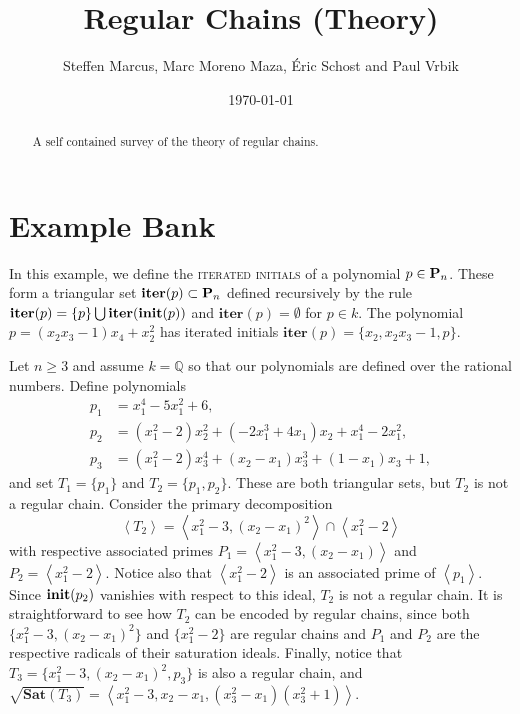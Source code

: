 \documentclass[12pt]{article}
\title{Regular Chains (Theory)}
\author{Steffen Marcus, Marc Moreno Maza, \'Eric Schost and Paul Vrbik}
\date{\today}
\newcommand{\Emph}[1]{\textsc{#1}}
\begin{document}
\maketitle


\begin{abstract}
A self contained survey of the theory of regular chains.
\end{abstract}

\section*{Example Bank}

\begin{example}  
In this example, we define the \Emph{iterated initials} of a polynomial $p\in\mathbf{P}_n$.  These form a triangular set $\textbf{iter}(p)\subset \mathbf{P}_n$ defined recursively by the rule $\textbf{iter}(p)=\{p\}\bigcup\textbf{iter}(\textbf{init}(p))$ and $\textbf{iter}(p) = \emptyset$ for $p\in k$.  The polynomial $p=(x_2x_3-1)x_4+x_2^2$ has iterated initials $\textbf{iter}(p)=\{x_2,x_2x_3-1,p\}$.
\end{example}

\begin{example}   
Let $n\geq 3$ and assume $k=\mathbb{Q}$ so that our polynomials are defined over the rational numbers.  Define polynomials
\begin{align*}
p_1 &= x_1^4-5x_1^2+6,\\
p_2 &=(x_1^2-2)x_2^2+(-2x_1^3+4x_1)x_2+x_1^4-2x_1^2,\\
p_3 &=(x_1^2-2)x_3^4+(x_2-x_1)x_3^3+(1-x_1)x_3+1,
\end{align*}
and set $T_1=\{p_1\}$ and $T_2=\{p_1,p_2\}$.  These are both triangular sets, but $T_2$ is not a regular chain.  Consider the primary decomposition
\[
\left<T_2\right>=\left<x_1^2-3,(x_2-x_1)^2\right>\cap\left<x_1^2-2\right>
\]
with respective associated primes $P_1=\left<x_1^2-3,(x_2-x_1)\right>$ and $P_2=\left<x_1^2-2\right>.$  Notice also that $\left<x_1^2-2\right>$ is an associated prime of $\left<p_1\right>$.  Since $\textbf{init}(p_2)$ vanishies with respect to this ideal, $T_2$ is not a regular chain.  It is straightforward to see how $T_2$ can be encoded by regular chains, since both $\{x_1^2-3,(x_2-x_1)^2\}$ and $\{x_1^2-2\}$ are regular chains and $P_1$ and $P_2$ are the respective radicals of their saturation ideals.  Finally, notice that $T_3=\{x_1^2-3,(x_2-x_1)^2, p_3\}$ is also a regular chain, and $\sqrt{\textbf{Sat}(T_3)}=\left<x_1^2-3,x_2-x_1, (x_3^2-x_1)(x_3^2+1)\right>$.
\end{example}
\end{document}

